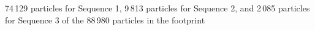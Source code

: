 74\,129 particles for Sequence 1, 9\,813 particles for Sequence 2, and 2\,085 particles for Sequence 3 of the 88\,980 particles in the footprint%
